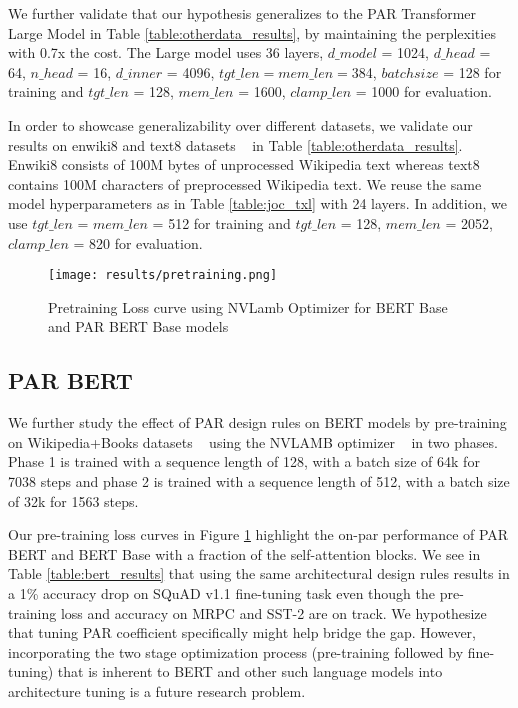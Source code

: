 \documentclass[11pt]{article}
\begin{document}
We further validate that our hypothesis generalizes to the PAR Transformer Large Model in Table \ref{table:otherdata_results}, by maintaining the perplexities with 0.7x the cost. The Large model uses 36 layers, $d\_model$ = 1024, $d\_head$ = 64, $n\_head$ = 16, $d\_inner$ = 4096, $tgt\_len = mem\_len = $384, $batch size$ = 128 for training and $tgt\_len$ = 128, $mem\_len$ = 1600, $clamp\_len$ = 1000 for evaluation.

In order to showcase generalizability over different datasets, we validate our results on enwiki8 and text8 datasets ~\citep{textenwiki} in Table \ref{table:otherdata_results}. Enwiki8 consists of 100M bytes of unprocessed Wikipedia text whereas text8 contains 100M characters of preprocessed Wikipedia text. We reuse the same model hyperparameters as in Table \ref{table:joc_txl} with 24 layers. In addition, we use $tgt\_len$ = $mem\_len$ = 512 for training and $tgt\_len$ = 128, $mem\_len$ = 2052, $clamp\_len$ = 820 for evaluation.


\begin{figure}
\centering
\texttt{[image: results/pretraining.png]}
\caption{Pretraining Loss curve using NVLamb Optimizer for BERT Base and PAR BERT Base models}
\label{fig:bert_pretraining}
\end{figure}

\subsection{PAR BERT}

We further study the effect of PAR design rules on BERT models by pre-training on Wikipedia+Books datasets ~\citep{bookscorpus} using the NVLAMB optimizer ~\citep{nvlamb} in two phases. Phase 1 is trained with a sequence length of 128, with a batch size of 64k for 7038 steps and phase 2 is trained with a sequence length of 512, with a batch size of 32k for 1563 steps. 

Our pre-training loss curves in Figure \ref{fig:bert_pretraining} highlight the on-par performance of PAR BERT and BERT Base with a fraction of the self-attention blocks. We see in Table \ref{table:bert_results} that using the same architectural design rules results in a 1\% accuracy drop on SQuAD v1.1 fine-tuning task even though the pre-training loss and accuracy on MRPC and SST-2 are on track. We hypothesize that tuning PAR coefficient specifically might help bridge the gap. However, incorporating the two stage optimization process (pre-training followed by fine-tuning) that is inherent to BERT and other such language models into architecture tuning is a future research problem.
\end{document}
